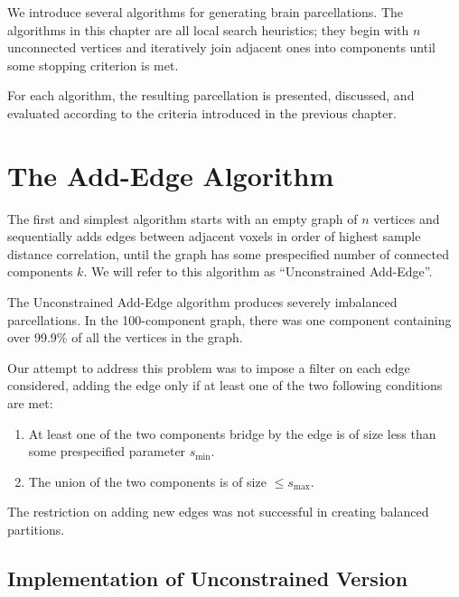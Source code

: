 
We introduce several algorithms for generating brain parcellations. The
algorithms in this chapter are all local search heuristics; they begin
with $n$ unconnected vertices and iteratively join adjacent ones into
components until some stopping criterion is met.

For each algorithm, the resulting parcellation is presented, discussed,
and evaluated according to the criteria introduced in the previous
chapter.

\section{The Add-Edge Algorithm}

The first and simplest algorithm starts with an empty graph of $n$
vertices and sequentially adds edges between adjacent voxels in order of
highest sample distance correlation, until the graph has some
prespecified number of connected components $k$. We will refer to this
algorithm as ``Unconstrained Add-Edge''.

The Unconstrained Add-Edge algorithm produces severely imbalanced
parcellations. In the 100-component graph, there was one component
containing over 99.9\% of all the vertices in the graph.

Our attempt to address this problem was to impose a filter on each edge
considered, adding the edge only if at least one of the two following
conditions are met:

\begin{enumerate}[1.]
\item
At least one of the two components bridge by the edge is of size less
than some prespecified parameter $s_{\min}$.

\item
The union of the two components is of size $\leq s_{\max}$.
\end{enumerate}

The restriction on adding new edges was not successful in creating
balanced partitions.

\subsection{Implementation of Unconstrained Version}

